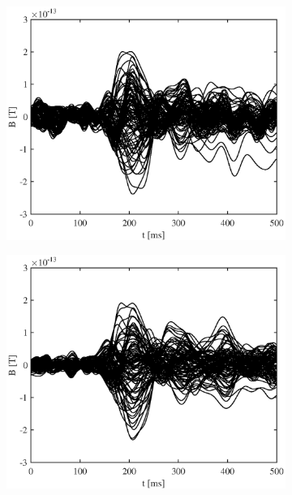 \documentclass[doc,a4paper,12pt]{apa6}
\begin{document}
\begin{figure}
\begin{subfigure}[c]{0.36\textwidth}
    \label{img:butterfly:grad:sss:pa10}
  \end{subfigure}
  \captionsetup{justification=justified}
  \vspace*{3mm}
  \caption[Gemessene Aktivität an den Gradiometern]{Gemessene Aktivität an den Gradiometern für beide Versuchspersonen, jeweils in Block 1 mit Rohdaten und SSS-Daten.}
  \label{img:butterfly:grad}
  \vspace*{5mm}
  \centering
  \captionsetup{justification=centering}
  \begin{subfigure}[c]{0.36\textwidth}
    \includegraphics[width=\textwidth]{ergebnisse/pa07/pa07a1_eve2_raw_mag_butterfly.eps}
    \label{img:butterfly:mag:raw:pa07}
  \end{subfigure}\hspace*{0.08\textwidth}
  \begin{subfigure}[c]{0.36\textwidth}
    \includegraphics[width=\textwidth]{ergebnisse/pa07/pa07a1_eve2_sss_mag_butterfly.eps}

\end{subfigure}
\end{figure}
\end{document}

